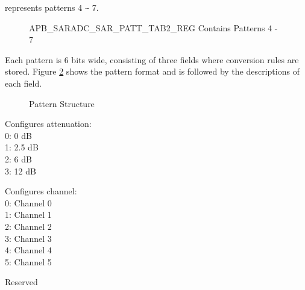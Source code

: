 \documentclass[main\_\_EN.tex]{subfiles}
\begin{document}
%
%
%
%
%
\begin{regdesc}\begin{reglist}
\item [cmd \regindex{x}] represents patterns 4 \verb+~+ 7.
\end{reglist}\end{regdesc}
\vspace{-2em}
\begin{figure}[H]
    \centering
    \caption{APB\_SARADC\_SAR\_PATT\_TAB2\_REG Contains Patterns 4 - 7}
    \label{fig:adc-apb-saradc-sar-patt-tab2-reg-pattern-tab-entry4-entry7}
\end{figure}

Each pattern is 6 bits wide, consisting of three fields where conversion rules are stored. Figure  \ref{fig:adc-pattern-table-entry} shows the pattern format and is followed by the descriptions of each field.

\begin{figure}[H]
\centering
{}%
%
%
\end{figure}
\vspace{-2em}
\begin{figure}[H]
    \centering
    \caption{Pattern Structure}
    \label{fig:adc-pattern-table-entry}
\end{figure}
\vspace{-2em}
\begin{regdesc}\begin{reglist}
\item [atten] Configures attenuation:\\
0: 0 dB\\
1: 2.5 dB\\
2: 6 dB\\
3: 12 dB
\item [ch\_sel] Configures channel:\\
0: Channel 0 \\
1: Channel 1 \\
2: Channel 2 \\
3: Channel 3 \\
4: Channel 4 \\
5: Channel 5 \\
\item [(reserved)] Reserved
\end{reglist}\end{regdesc}
\end{document}
